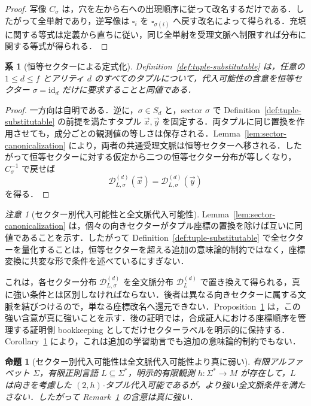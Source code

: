 \documentclass[11pt,a4paper]{ltjsarticle}
\numberwithin{equation}{section}
\theoremstyle{plain}
\newtheorem{proposition}[theorem]{命題}
\newtheorem{corollary}[theorem]{系}
\theoremstyle{definition}
\theoremstyle{remark}
\newtheorem{remark}[theorem]{注意}
\newcommand{\D}{\mathcal{D}}
\newcommand{\tuple}[1]{\vec{#1}}
\newcommand{\blank}{\square}
\begin{document}
\begin{proof}
写像 $C_\sigma$ は，穴を左から右への出現順序に従って改名するだけである．したがって全単射であり，逆写像は $\blank_i$ を $\blank_{\sigma(i)}$ へ戻す改名によって得られる．充填に関する等式は定義から直ちに従い，同じ全単射を受理文脈へ制限すれば分布に関する等式が得られる．
\end{proof}

\begin{corollary}[恒等セクターによる定式化]
\label{cor:identity-sector-equivalence}
Definition~\ref{def:tuple-substitutable} は，任意の $1\le d\le f$ とアリティ $d$ のすべてのタプルについて，代入可能性の含意を恒等セクター $\sigma=\mathrm{id}_d$ だけに要求することと同値である．
\end{corollary}

\begin{proof}
一方向は自明である．逆に，$\sigma\in S_d$ と，sector $\sigma$ で Definition~\ref{def:tuple-substitutable} の前提を満たすタプル $\tuple x,\tuple y$ を固定する．両タプルに同じ置換を作用させても，成分ごとの観測値の等しさは保存される．Lemma~\ref{lem:sector-canonicalization} により，両者の共通受理文脈は恒等セクターへ移される．したがって恒等セクターに対する仮定から二つの恒等セクター分布が等しくなり，$C_\sigma^{-1}$ で戻せば
\[
  \D_{L,\sigma}^{(d)}(\tuple x)
  =
  \D_{L,\sigma}^{(d)}(\tuple y)
\]
を得る．
\end{proof}

\begin{remark}[セクター別代入可能性と全文脈代入可能性]
\label{rem:full-context-stronger}
Lemma~\ref{lem:sector-canonicalization} は，個々の向きセクターがタプル座標の置換を除けば互いに同値であることを示す．したがって Definition~\ref{def:tuple-substitutable} で全セクターを量化することは，恒等セクターを超える追加の意味論的制約ではなく，座標変換に共変な形で条件を述べているにすぎない．

これは，各セクター分布 $\D_{L,\sigma}^{(d)}$ を全文脈分布 $\D_L^{(d)}$ で置き換えて得られる，真に強い条件とは区別しなければならない．後者は異なる向きセクターに属する文脈を結びつけるので，単なる座標改名へ還元できない．Proposition~\ref{prop:orientation-strict} は，この強い含意が真に強いことを示す．後の証明では，合成証人における座標順序を管理する証明側 bookkeeping としてだけセクターラベルを明示的に保持する．Corollary~\ref{cor:identity-sector-equivalence} により，これは追加の学習助言でも追加の意味論的制約でもない．
\end{remark}

\begin{proposition}[セクター別代入可能性は全文脈代入可能性より真に弱い]
\label{prop:orientation-strict}
有限アルファベット $\Sigma$，有限正則言語 $L\subseteq\Sigma^*$，明示的有限観測 $h:\Sigma^*\to M$ が存在して，$L$ は向きを考慮した $(2,h)$-タプル代入可能であるが，より強い全文脈条件を満たさない．したがって Remark~\ref{rem:full-context-stronger} の含意は真に強い．
\end{proposition}
\end{document}
